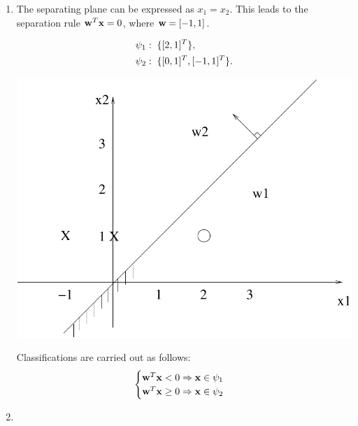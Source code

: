 \begin{enumerate}
\begin{solution}
    \begin{enumerate} 
    \item

      The separating plane can be expressed as $x_1 = x_2$. This leads to
      the separation rule ${\bf{w}}^T {\bf{x}}=0$, where ${\bf{w}}=[-1,1]$.
      
      \begin{align}
        &\psi_1: \text{\;} \{[2,1]^T\}, \notag \\
        &\psi_2: \text{\;} \{[0,1]^T, [-1,1]^T \}. \notag
      \end{align}
      \begin{center}
        \includegraphics[scale=0.35]{e4_5}
      \end{center}

      Classifications are carried out as follows:
      \begin{equation*}
        \begin{cases}
          {\bf{w}}^T{\bf{x}}<0 \Rightarrow {\bf{x}} \in \psi_1\\
          {\bf{w}}^T{\bf{x}}\geq 0 \Rightarrow {\bf{x}} \in \psi_2\\
        \end{cases}
      \end{equation*}

    \item


\end{enumerate}
\end{solution}
\end{enumerate}
